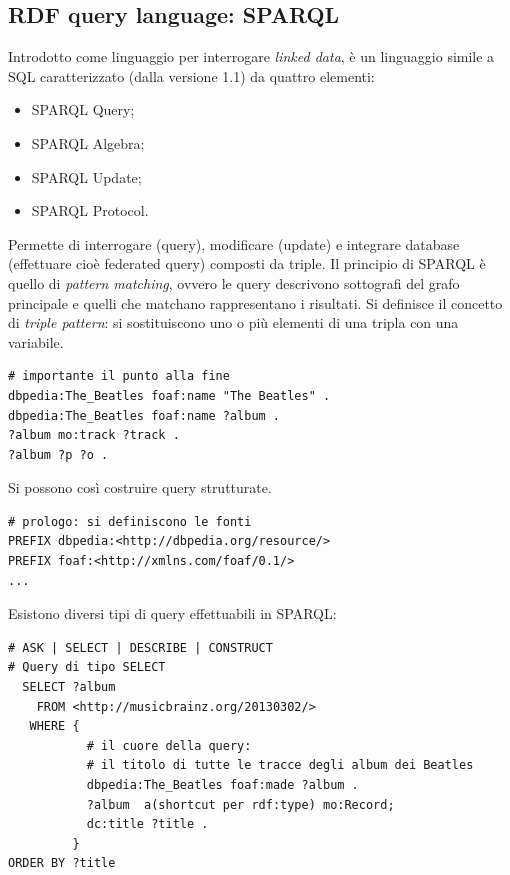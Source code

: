 \documentclass[11pt]{article}
\begin{document}
\subsection{RDF query language: SPARQL}
Introdotto come linguaggio per interrogare \textit{linked data}, è un linguaggio simile a SQL caratterizzato (dalla versione 1.1) da quattro elementi:
\begin{itemize}
  \item SPARQL Query;
  \item SPARQL Algebra;
  \item SPARQL Update;
  \item SPARQL Protocol.
\end{itemize}
Permette di interrogare (query), modificare (update) e integrare database (effettuare cioè federated query) composti da triple. Il principio di SPARQL è quello di \textit{pattern matching}, ovvero le query descrivono sottografi del grafo principale e quelli che matchano rappresentano i risultati.
Si definisce il concetto di \textit{triple pattern}: si sostituiscono uno o più elementi di una tripla con una variabile.
\begin{lstlisting}[language=sparql]
                             # importante il punto alla fine
dbpedia:The_Beatles foaf:name "The Beatles" .
dbpedia:The_Beatles foaf:name ?album .
?album mo:track ?track .
?album ?p ?o .
\end{lstlisting}

Si possono così costruire query strutturate.
\begin{lstlisting}[language=sparql]
# prologo: si definiscono le fonti
PREFIX dbpedia:<http://dbpedia.org/resource/>
PREFIX foaf:<http://xmlns.com/foaf/0.1/>
...
\end{lstlisting}
Esistono diversi tipi di query effettuabili in SPARQL:
\begin{lstlisting}[language=sparql]
# ASK | SELECT | DESCRIBE | CONSTRUCT
# Query di tipo SELECT
  SELECT ?album
    FROM <http://musicbrainz.org/20130302/>
   WHERE {
           # il cuore della query:
           # il titolo di tutte le tracce degli album dei Beatles
           dbpedia:The_Beatles foaf:made ?album .
           ?album  a(shortcut per rdf:type) mo:Record;
           dc:title ?title .
         }
ORDER BY ?title
\end{lstlisting}
\end{document}
